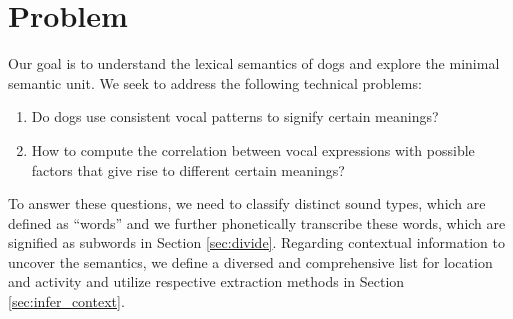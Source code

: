\section{Problem}
\label{sec:problem}

Our goal is to understand the lexical semantics of dogs and explore the minimal semantic unit.  
We seek to address the following technical problems: 
\begin{enumerate}
	\item Do dogs use consistent vocal patterns to signify certain meanings?
	\item How to compute the correlation between vocal expressions with possible factors that give rise to different certain meanings?


\end{enumerate}

To answer these questions, we need to classify distinct sound types, which are defined as ``words'' and we further phonetically transcribe these words, which are signified as subwords in Section \ref{sec:divide}. Regarding contextual information to uncover the semantics, we define a diversed and comprehensive list for location and activity and utilize respective extraction methods in Section \ref{sec:infer_context}.


